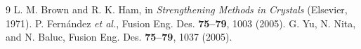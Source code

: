 \documentclass[aps,prl,onecolumn,superscriptaddress,amsmath,amssymb,floatfix]{revtex4-2}
\begin{document}
\begin{thebibliography}{9}
 L. M. Brown and R. K. Ham, in \emph{Strengthening Methods in Crystals} (Elsevier, 1971).
 P. Fern\'andez \emph{et al.}, Fusion Eng. Des. \textbf{75--79}, 1003 (2005).
 G. Yu, N. Nita, and N. Baluc, Fusion Eng. Des. \textbf{75--79}, 1037 (2005).
\end{thebibliography}
\end{document}
